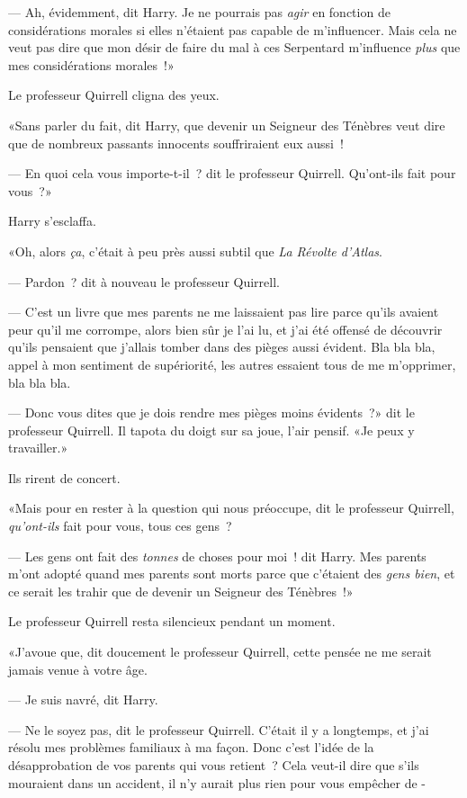 --- Ah, évidemment, dit Harry. Je ne pourrais pas \emph{agir} en fonction de considérations morales si elles n'étaient pas capable de m'influencer. Mais cela ne veut pas dire que mon désir de faire du mal à ces Serpentard m'influence \emph{plus} que mes considérations morales~!»

Le professeur Quirrell cligna des yeux.

«Sans parler du fait, dit Harry, que devenir un Seigneur des Ténèbres veut dire que de nombreux passants innocents souffriraient eux aussi~!

--- En quoi cela vous importe-t-il~? dit le professeur Quirrell. Qu'ont-ils fait pour vous~?»

Harry s'esclaffa.

«Oh, alors \emph{ça}, c'était à peu près aussi subtil que \emph{La Révolte d'Atlas}.

--- Pardon~? dit à nouveau le professeur Quirrell.

--- C'est un livre que mes parents ne me laissaient pas lire parce qu'ils avaient peur qu'il me corrompe, alors bien sûr je l'ai lu, et j'ai été offensé de découvrir qu'ils pensaient que j'allais tomber dans des pièges aussi évident. Bla bla bla, appel à mon sentiment de supériorité, les autres essaient tous de me m'opprimer, bla bla bla.

--- Donc vous dites que je dois rendre mes pièges moins évidents~?» dit le professeur Quirrell. Il tapota du doigt sur sa joue, l'air pensif. «Je peux y travailler.»

Ils rirent de concert.

«Mais pour en rester à la question qui nous préoccupe, dit le professeur Quirrell, \emph{qu'ont-ils} fait pour vous, tous ces gens~?

--- Les gens ont fait des \emph{tonnes} de choses pour moi~! dit Harry. Mes parents m'ont adopté quand mes parents sont morts parce que c'étaient des \emph{gens bien}, et ce serait les trahir que de devenir un Seigneur des Ténèbres~!»

Le professeur Quirrell resta silencieux pendant un moment.

«J'avoue que, dit doucement le professeur Quirrell, cette pensée ne me serait jamais venue à votre âge.

--- Je suis navré, dit Harry.

--- Ne le soyez pas, dit le professeur Quirrell. C'était il y a longtemps, et j'ai résolu mes problèmes familiaux à ma façon. Donc c'est l'idée de la désapprobation de vos parents qui vous retient~? Cela veut-il dire que s'ils mouraient dans un accident, il n'y aurait plus rien pour vous empêcher de -

